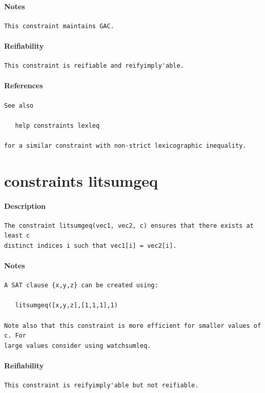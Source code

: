 \documentclass[oneside]{book}
\begin{document}
\paragraph{Notes}
{\footnotesize
\begin{verbatim}
This constraint maintains GAC.
\end{verbatim}
}
\paragraph{Reifiability}
{\footnotesize
\begin{verbatim}
This constraint is reifiable and reifyimply'able.
\end{verbatim}
}
\paragraph{References}
{\footnotesize
\begin{verbatim}
See also

   help constraints lexleq

for a similar constraint with non-strict lexicographic inequality.
\end{verbatim}
}
\section{constraints litsumgeq}
\paragraph{Description}
{\footnotesize
\begin{verbatim}
The constraint litsumgeq(vec1, vec2, c) ensures that there exists at least c
distinct indices i such that vec1[i] = vec2[i].
\end{verbatim}
}
\paragraph{Notes}
{\footnotesize
\begin{verbatim}
A SAT clause {x,y,z} can be created using:

   litsumgeq([x,y,z],[1,1,1],1)

Note also that this constraint is more efficient for smaller values of c. For
large values consider using watchsumleq.
\end{verbatim}
}
\paragraph{Reifiability}
{\footnotesize
\begin{verbatim}
This constraint is reifyimply'able but not reifiable.
\end{verbatim}
}
\end{document}
